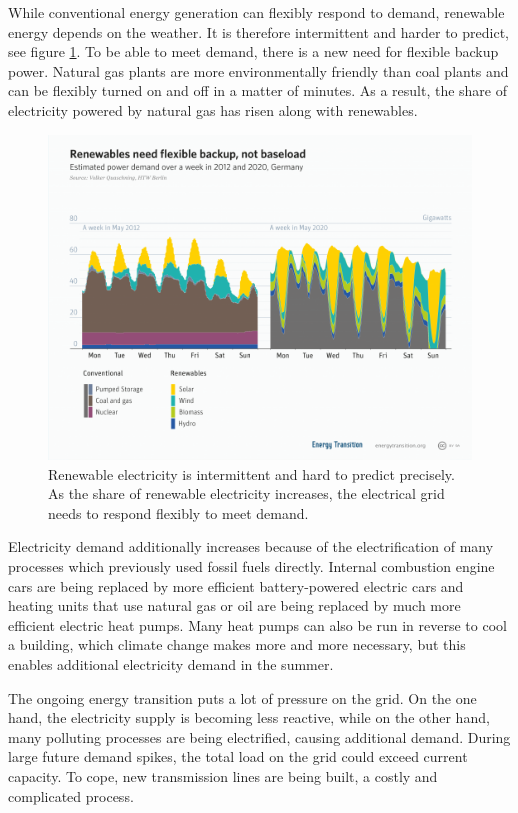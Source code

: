 While conventional energy generation can flexibly respond to demand, renewable energy depends on the weather.
It is therefore intermittent and harder to predict, see figure \ref{fig:flexibility}. To be able to meet demand, there is a new need for flexible backup power.
Natural gas plants are more environmentally friendly than coal plants and can be flexibly turned on and off in a matter of minutes.
As a result, the share of electricity powered by natural gas has risen along with renewables.

\begin{figure}
    \centering
    \includegraphics[width = \figurewidth]{figures/flexible_renewables.png}
    \caption{Renewable electricity is intermittent and hard to predict precisely. As the share of renewable electricity increases, the electrical grid needs to respond flexibly to meet demand.}
    \label{fig:flexibility}
\end{figure}


Electricity demand additionally increases because of the electrification of many processes which previously used fossil fuels directly.
Internal combustion engine cars are being replaced by more efficient battery-powered electric cars and heating units that use natural gas or oil are being replaced by much more efficient electric heat pumps.
Many heat pumps can also be run in reverse to cool a building, which climate change makes more and more necessary, but this enables additional electricity demand in the summer.

The ongoing energy transition puts a lot of pressure on the grid.
On the one hand, the electricity supply is becoming less reactive, while on the other hand, many polluting processes are being electrified, causing additional demand.
During large future demand spikes, the total load on the grid could exceed current capacity. To cope, new transmission lines are being built, a costly and complicated process.

